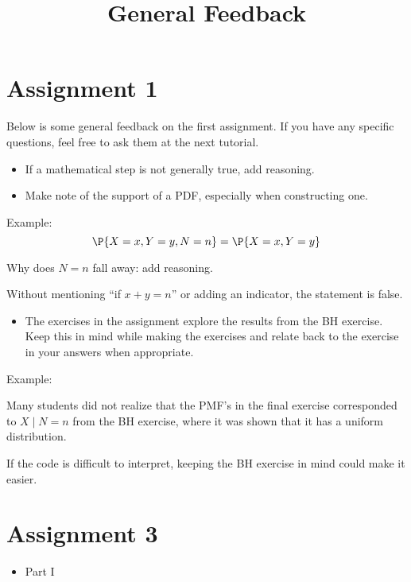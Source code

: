 


\title{General Feedback}


\maketitle

\section*{Assignment 1}
Below is some general feedback on the first assignment. If you have
any specific questions, feel free to ask them at the next tutorial.

\begin{itemize}
\item If a mathematical step is not generally true, add reasoning.
\item Make note of the support of a PDF, especially when constructing one.
\end{itemize}

Example:
$$\P{X=x, Y=y, N=n} = \P{X=x, Y=y}$$

Why does $N=n$ fall away: add reasoning.

Without mentioning ``if $x+y=n$'' or adding an indicator, the
statement is false.

\begin{itemize}
\item The exercises in the assignment explore the results from the BH
exercise. Keep this in mind while making the exercises and relate
back to the exercise in your answers when appropriate.
\end{itemize}

Example:

Many students did not realize that the PMF's in the final exercise
corresponded to $X\mid N=n$ from the BH exercise, where it was shown
that it has a uniform distribution.

If the code is difficult to interpret, keeping the BH exercise in
mind could make it easier.

\section*{Assignment 3}

\begin{itemize}
\item Part I
\end{itemize}

